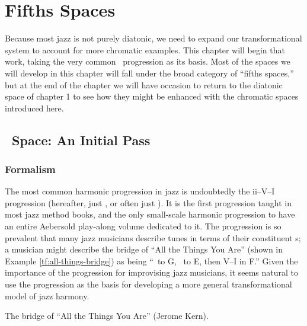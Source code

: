 
\chapter{Fifths Spaces}

%
%
Because most jazz is not purely diatonic, we need to expand our
transformational system to account for more chromatic examples. This chapter
will begin that work, taking the very common \tfo\ progression as its basis.
Most of the spaces we will develop in this chapter will fall under the broad
category of “fifths spaces,” but at the end of the chapter we will have
occasion to return to the diatonic space of chapter 1 to see how they might be
enhanced with the chromatic spaces introduced here.

\section{\tf\ Space: An Initial Pass}

\subsection{Formalism}

The most common harmonic progression in jazz is undoubtedly the
\mbox{ii--V--I} progression (hereafter, just \tfo, or
often just \tf). It is the first progression taught in most jazz method books,
and the only small-scale harmonic progression to have an entire Aebersold
play-along volume dedicated to it. The progression is so prevalent
that many jazz musicians describe tunes in terms of their constituent \tf{}s;
a musician might describe the bridge of “All the Things You Are” (shown in
Example \ref{tf:all-things-bridge}) as being “\tf\ to G, \tf\ to E, then V--I
in F.” Given the importance of the progression for improvising jazz
musicians, it seems natural to use the progression as the basis for developing
a more general transformational model of jazz harmony.

\begin{example}[tbp]
  \caption{The bridge of “All the Things You Are” (Jerome Kern).}
  \label{tf:all-things-bridge}
\end{example}

